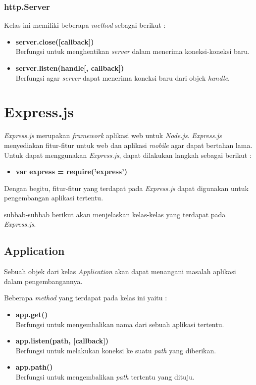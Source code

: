 \subsubsection{http.Server}
Kelas ini memiliki beberapa \textit{method} sebagai berikut : 

\begin{itemize}
	\item \textbf{server.close([callback])} \\ Berfungsi untuk menghentikan \textit{server} dalam menerima koneksi-koneksi baru.
	\item \textbf{server.listen(handle[, callback])} \\ Berfungsi agar \textit{server} dapat menerima koneksi baru dari objek \textit{handle}.
\end{itemize}


\section{Express.js}
\label{sec:Express.js}

\textit{Express.js} merupakan \textit{framework} aplikasi web untuk \textit{Node.js}. \textit{Express.js} menyediakan fitur-fitur untuk web dan aplikasi \textit{mobile} agar dapat bertahan lama. Untuk dapat menggunakan \textit{Express.js}, dapat dilakukan langkah sebagai berikut : 
\begin{itemize}
	\item \textbf{var express = require('express')}
\end{itemize}

Dengan begitu, fitur-fitur yang terdapat pada \textit{Express.js} dapat digunakan untuk pengembangan aplikasi tertentu.

subbab-subbab berikut akan menjelaskan kelas-kelas yang terdapat pada \textit{Express.js}.

\subsection{Application}
Sebuah objek dari kelas \textit{Application} akan dapat menangani masalah aplikasi dalam pengembangannya. 

Beberapa \textit{method} yang terdapat pada kelas ini yaitu : 
\begin{itemize}
	\item \textbf{app.get()} \\ Berfungsi untuk mengembalikan nama dari sebuah aplikasi tertentu.
	\item \textbf{app.listen(path, [callback])} \\ Berfungsi untuk melakukan koneksi ke suatu \textit{path} yang diberikan.
	\item \textbf{app.path()} \\ Berfungsi untuk mengembalikan \textit{path} tertentu yang dituju.
\end{itemize}

